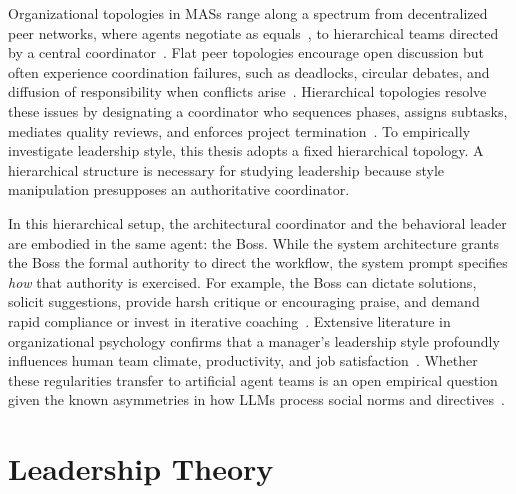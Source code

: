 Organizational topologies in \acp{MAS} range along a spectrum from decentralized peer networks, where agents negotiate as equals~\cite{muralidharan2025lessonshumanteamsapplied, chen2023agentversefacilitatingmultiagentcollaboration}, to hierarchical teams directed by a central coordinator~\cite{guo2024embodiedllmagentslearn, dang2025multiagentcollaborationevolvingorchestration}.
Flat peer topologies encourage open discussion but often experience coordination failures, such as deadlocks, circular debates, and diffusion of responsibility when conflicts arise~\cite{li2023camelcommunicativeagentsmind, guo2024embodiedllmagentslearn, kwak2026leadershipcoordinationcontrolbehavioral}.
Hierarchical topologies resolve these issues by designating a coordinator who sequences phases, assigns subtasks, mediates quality reviews, and enforces project termination~\cite{wang2025talkstructurallyacthierarchically, muralidharan2025lessonshumanteamsapplied}.
To empirically investigate leadership style, this thesis adopts a fixed hierarchical topology.
A hierarchical structure is necessary for studying leadership because style manipulation presupposes an authoritative coordinator.

In this hierarchical setup, the architectural coordinator and the behavioral leader are embodied in the same agent: the Boss.
While the system architecture grants the Boss the formal authority to direct the workflow, the system prompt specifies \emph{how} that authority is exercised.
For example, the Boss can dictate solutions, solicit suggestions, provide harsh critique or encouraging praise, and demand rapid compliance or invest in iterative coaching~\cite{goleman2000leadership, kwak2026leadershipcoordinationcontrolbehavioral}.
Extensive literature in organizational psychology confirms that a manager's leadership style profoundly influences human team climate, productivity, and job satisfaction~\cite{goleman2000leadership, schadowwolf2026effectiveleadership, lewin1939patterns, wageman2005teamdiagnosticsurvey}.
Whether these regularities transfer to artificial agent teams is an open empirical question given the known asymmetries in how \acp{LLM} process social norms and directives~\cite{muralidharan2025lessonshumanteamsapplied, kwak2026leadershipcoordinationcontrolbehavioral}.

\section{Leadership Theory}
\label{sec:leadership-theory}

